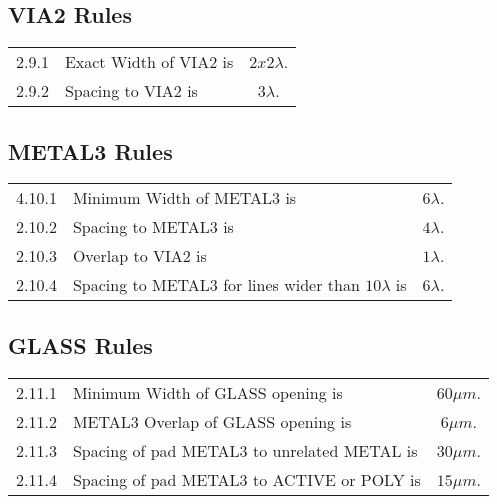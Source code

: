 \subsection{VIA2 Rules}\label{design_rules_via2_rules}

\begin{flushleft}
    \begin{tabular}{c l c}
        2.9.1   & Exact Width of VIA2 is & $2x2 \lambda$. \\
        2.9.2   & Spacing to VIA2 is & $3 \lambda$. \\
    \end{tabular}
\end{flushleft}

\subsection{METAL3 Rules}\label{design_rules_metal3_rules}

\begin{flushleft}
    \begin{tabular}{c l c}
        4.10.1  & Minimum Width of METAL3 is & $6 \lambda$. \\
        2.10.2  & Spacing to METAL3 is & $4 \lambda$. \\
        2.10.3  & Overlap to VIA2 is & $1 \lambda$. \\
        2.10.4   & Spacing to METAL3 for lines wider than $10 \lambda $ is & $6 \lambda$. \\
    \end{tabular}
\end{flushleft}

\subsection{GLASS Rules}\label{design_rules_glass_rules}

\begin{flushleft}
    \begin{tabular}{c l c}
        2.11.1  & Minimum Width of GLASS opening is & $60 \mu m$. \\
        2.11.2  & METAL3 Overlap of GLASS opening is & $6 \mu m$. \\
        2.11.3  & Spacing of pad METAL3 to unrelated METAL is & $30 \mu m$. \\
        2.11.4  & Spacing of pad METAL3 to ACTIVE or POLY is & $15 \mu m$. \\
    \end{tabular}
\end{flushleft}


